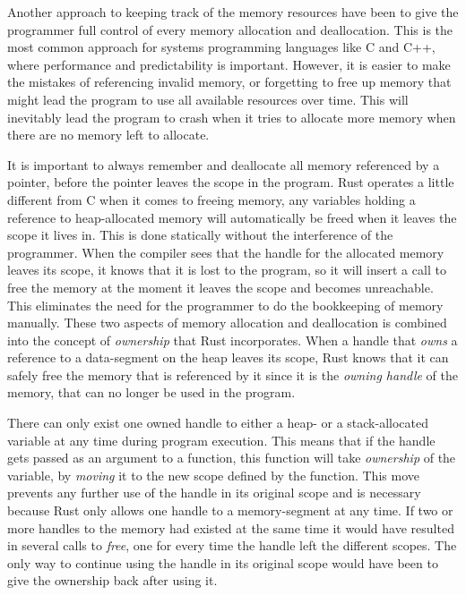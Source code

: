 Another approach to keeping track of the memory resources have been to give the programmer full control of every memory allocation and deallocation.
This is the most common approach for systems programming languages like C and C++, where performance and predictability is important.
However, it is easier to make the mistakes of referencing invalid memory, or forgetting to free up memory that might lead the program to use all available resources over time.
This will inevitably lead the program to crash when it tries to allocate more memory when there are no memory left to allocate.


It is important to always remember and deallocate all memory referenced by a pointer, before the pointer leaves the scope in the program.
Rust operates a little different from C when it comes to freeing memory, any variables holding a reference to heap-allocated memory will automatically be freed when it leaves the scope it lives in. This is done statically without the interference of the programmer.
When the compiler sees that the handle for the allocated memory leaves its scope, it knows that it is lost to the program, so it will insert a call to free the memory at the moment it leaves the scope and becomes unreachable.
This eliminates the need for the programmer to do the bookkeeping of memory manually.
These two aspects of memory allocation and deallocation is combined into the concept of \emph{ownership} that Rust incorporates.
When a handle that \emph{owns} a reference to a data-segment on the heap leaves its scope, Rust knows that it can safely free the memory that is referenced by it since it is the \emph{owning handle} of the memory, that can no longer be used in the program.


There can only exist one owned handle to either a heap- or a stack-allocated variable at any time during program execution.
This means that if the handle gets passed as an argument to a function, this function will take \emph{ownership} of the variable, by \emph{moving} it to the new scope defined by the function.
This move prevents any further use of the handle in its original scope and is necessary because Rust only allows one handle to a memory-segment at any time.
If two or more handles to the memory had existed at the same time it would have resulted in several calls to \emph{free}, one for every time the handle left the different scopes.
The only way to continue using the handle in its original scope would have been to give the ownership back after using it.

